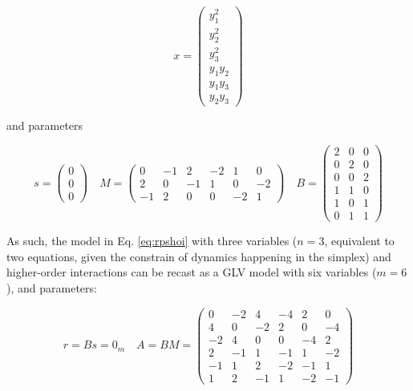 \documentclass{article}
\begin{document}
\begin{equation}
\label{eq:rpshoimon}
x = 
\begin{pmatrix}
y_1^2\\ y_2^2 \\ y_3^2 \\ y_1 y_2 \\ y_1 y_3 \\ y_2 y_3
\end{pmatrix} 
\end{equation}

and parameters

\begin{equation}
\label{eq:rpshoiqp}
s = \begin{pmatrix}
0\\
0\\
0
\end{pmatrix} \quad 
M = \begin{pmatrix}
0 & -1 & 2 & -2 & 1 & 0\\
2 & 0 & -1 & 1 & 0 & -2\\
-1 & 2 & 0 & 0 & -2 & 1
\end{pmatrix} \quad
B = \begin{pmatrix}
2 & 0 & 0 \\
0 & 2 & 0 \\
0 & 0 & 2 \\
1 & 1 & 0 \\
1 & 0 & 1 \\
0 & 1 & 1
\end{pmatrix}
\end{equation}

As such, the model in Eq. \ref{eq:rpshoi} with three variables (\(n=3\),
equivalent to two equations, given the constrain of dynamics happening
in the simplex) and higher-order interactions can be recast as a GLV
model with six variables (\(m = 6\)), and parameters:

\begin{equation}
r = B s = 0_m
\quad
A = B M = \begin{pmatrix}
0 & -2 & 4 & -4 & 2 & 0 \\ 
4 & 0 & -2 & 2 & 0 & -4 \\ 
-2 & 4 & 0 & 0 & -4 & 2 \\ 
2 & -1 & 1 & -1 & 1 & -2 \\ 
-1 & 1 & 2 & -2 & -1 & 1 \\ 
1 & 2 & -1 & 1 & -2 & -1
\end{pmatrix}
\end{equation}
\end{document}
